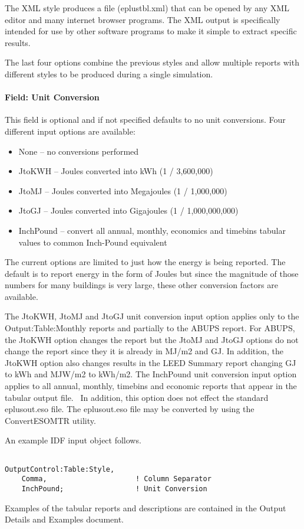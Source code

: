 The XML style produces a file (eplustbl.xml) that can be opened by any XML editor and many internet browser programs. The XML output is specifically intended for use by other software programs to make it simple to extract specific results.

The last four options combine the previous styles and allow multiple reports with different styles to be produced during a single simulation.

\paragraph{Field: Unit Conversion}\label{field-unit-conversion}

This field is optional and if not specified defaults to no unit conversions. Four different input options are available:

\begin{itemize}
\item
  None -- no conversions performed
\item
  JtoKWH -- Joules converted into kWh (1 / 3,600,000)
\item
  JtoMJ -- Joules converted into Megajoules (1 / 1,000,000)
\item
  JtoGJ -- Joules converted into Gigajoules (1 / 1,000,000,000)
\item
  InchPound -- convert all annual, monthly, economics and timebins tabular values to common Inch-Pound equivalent
\end{itemize}

The current options are limited to just how the energy is being reported. The default is to report energy in the form of Joules but since the magnitude of those numbers for many buildings is very large, these other conversion factors are available.

The JtoKWH, JtoMJ and JtoGJ unit conversion input option applies only to the Output:Table:Monthly reports and partially to the ABUPS report. For ABUPS, the JtoKWH option changes the report but the JtoMJ and JtoGJ options do not change the report since they it is already in MJ/m2 and GJ. In addition, the JtoKWH option also changes results in the LEED Summary report changing GJ to kWh and MJW/m2 to kWh/m2. The InchPound unit conversion input option applies to all annual, monthly, timebins and economic reports that appear in the tabular output file.~ In addition, this option does not effect the standard eplusout.eso file. The eplusout.eso file may be converted by using the ConvertESOMTR utility.

An example IDF input object follows.

\begin{lstlisting}

OutputControl:Table:Style,
    Comma,                     ! Column Separator
    InchPound;                 ! Unit Conversion
\end{lstlisting}

Examples of the tabular reports and descriptions are contained in the Output Details and Examples document.
